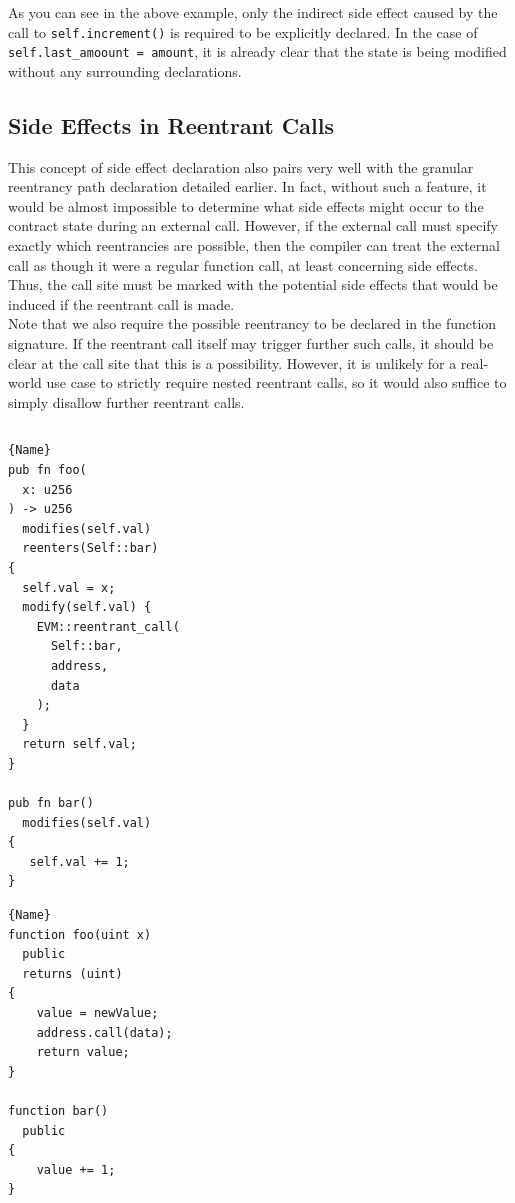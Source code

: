 As you can see in the above example, only the indirect side effect caused by the call to \lstinline{self.increment()} is required to be explicitly declared. In the case of \lstinline{self.last_amoount = amount}, it is already clear that the state is being modified without any surrounding declarations.

\subsection{Side Effects in Reentrant Calls}

This concept of side effect declaration also pairs very well with the granular reentrancy path declaration detailed earlier. In fact, without such a feature, it would be almost impossible to determine what side effects might occur to the contract state during an external call. However, if the external call must specify exactly which reentrancies are possible, then the compiler can treat the external call as though it were a regular function call, at least concerning side effects. Thus, the call site must be marked with the potential side effects that would be induced if the reentrant call is made.\\
Note that we also require the possible reentrancy to be declared in the function signature. If the reentrant call itself may trigger further such calls, it should be clear at the call site that this is a possibility. However, it is unlikely for a real-world use case to strictly require nested reentrant calls, so it would also suffice to simply disallow further reentrant calls.

\begin{lstlisting}
\end{lstlisting}

\noindent\begin{minipage}{.45\textwidth}
\begin{lstlisting}[caption=Ours,frame=tlrb]{Name}
pub fn foo(
  x: u256
) -> u256
  modifies(self.val)
  reenters(Self::bar)
{
  self.val = x;
  modify(self.val) {
    EVM::reentrant_call(
      Self::bar,
      address,
      data
    );
  }
  return self.val;
}

pub fn bar()
  modifies(self.val)
{
   self.val += 1;
}
\end{lstlisting}
\end{minipage}\hfill
\begin{minipage}{.45\textwidth}
\begin{lstlisting}[caption=Solidity,frame=tlrb]{Name}
function foo(uint x)
  public
  returns (uint)
{
    value = newValue;
    address.call(data);
    return value;
}

function bar()
  public
{
    value += 1;
}
\end{lstlisting}
\end{minipage}

